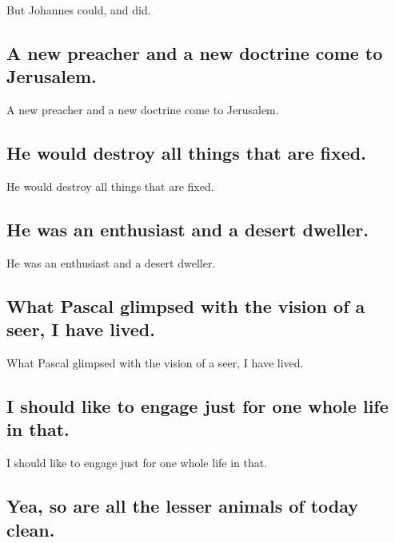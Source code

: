 \documentclass[]{article}
\begin{document}
But Johannes could, and did.

\hypertarget{a-new-preacher-and-a-new-doctrine-come-to-jerusalem.}{%
\subsection{A new preacher and a new doctrine come to
Jerusalem.}\label{a-new-preacher-and-a-new-doctrine-come-to-jerusalem.}}

A new preacher and a new doctrine come to Jerusalem.

\hypertarget{he-would-destroy-all-things-that-are-fixed.}{%
\subsection{He would destroy all things that are
fixed.}\label{he-would-destroy-all-things-that-are-fixed.}}

He would destroy all things that are fixed.

\hypertarget{he-was-an-enthusiast-and-a-desert-dweller.}{%
\subsection{He was an enthusiast and a desert
dweller.}\label{he-was-an-enthusiast-and-a-desert-dweller.}}

He was an enthusiast and a desert dweller.

\hypertarget{what-pascal-glimpsed-with-the-vision-of-a-seer-i-have-lived.}{%
\subsection{What Pascal glimpsed with the vision of a seer, I have
lived.}\label{what-pascal-glimpsed-with-the-vision-of-a-seer-i-have-lived.}}

What Pascal glimpsed with the vision of a seer, I have lived.

\hypertarget{i-should-like-to-engage-just-for-one-whole-life-in-that.}{%
\subsection{I should like to engage just for one whole life in
that.}\label{i-should-like-to-engage-just-for-one-whole-life-in-that.}}

I should like to engage just for one whole life in that.

\hypertarget{yea-so-are-all-the-lesser-animals-of-today-clean.}{%
\subsection{Yea, so are all the lesser animals of today
clean.}\label{yea-so-are-all-the-lesser-animals-of-today-clean.}}
\end{document}
